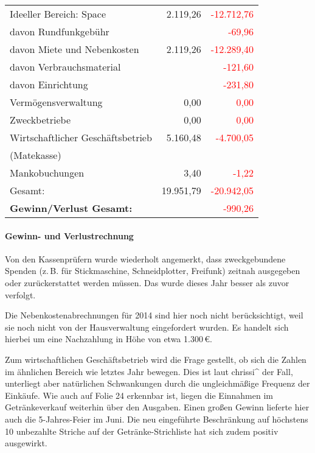 \documentclass{s0minutes}
\begin{document}
\begin{longtable}{lr>{\textcolor{red}\bgroup}r<{\egroup}}
  \midrule
  Ideeller Bereich: Space           &  2{.}119{,}26 & -12{.}712{,}76 \\
  \quad davon Rundfunkgebühr        &               &       -69{,}96 \\
  \quad davon Miete und Nebenkosten &  2{.}119{,}26 & -12{.}289{,}40 \\
  \quad davon Verbrauchsmaterial    &               &      -121{,}60 \\
  \quad davon Einrichtung           &               &      -231{,}80 \\
  \midrule
  Vermögensverwaltung               &        0{,}00 &         0{,}00 \\
  \midrule
  Zweckbetriebe                     &        0{,}00 &         0{,}00 \\
  \midrule
  Wirtschaftlicher Geschäftsbetrieb &  5{.}160{,}48 &  -4{.}700{,}05 \\
  \quad (Matekasse) && \\
  \midrule
  Mankobuchungen                    &        3{,}40 &        -1{,}22 \\
  \midrule\midrule
  Gesamt:                           & 19{.}951{,}79 & -20{.}942{,}05 \\

  \textbf{Gewinn/Verlust Gesamt:}   &               &      -990{,}26 \\
\end{longtable}

\paragraph{Gewinn- und Verlustrechnung} Von den Kassenprüfern wurde wiederholt
angemerkt, dass zweckgebundene Spenden (z.\,B. für Stickmaschine,
Schneidplotter, Freifunk) zeitnah ausgegeben oder zurückerstattet werden
müssen. Das wurde dieses Jahr besser als zuvor verfolgt.

Die Nebenkostenabrechnungen für 2014 sind hier noch nicht berücksichtigt, weil
sie noch nicht von der Hausverwaltung eingefordert wurden. Es handelt sich
hierbei um eine Nachzahlung in Höhe von etwa 1{.}300\,€.

Zum wirtschaftlichen Geschäftsbetrieb wird die Frage gestellt, ob sich die
Zahlen im ähnlichen Bereich wie letztes Jahr bewegen. Dies ist laut chrissi\^{}
der Fall, unterliegt aber natürlichen Schwankungen durch die ungleichmäßige
Frequenz der Einkäufe. Wie auch auf Folie 24 erkennbar ist, liegen die Einnahmen
im Getränkeverkauf weiterhin über den Ausgaben. Einen großen Gewinn lieferte
hier auch die 5-Jahres-Feier im Juni. Die neu eingeführte Beschränkung auf
höchstens 10 unbezahlte Striche auf der Getränke-Strichliste hat sich zudem
positiv ausgewirkt.
\end{document}
